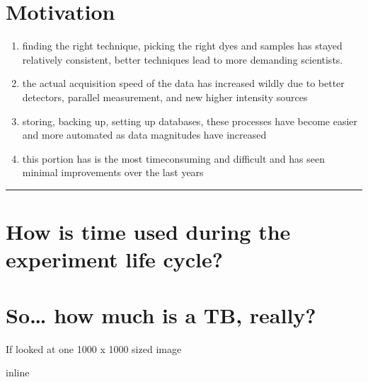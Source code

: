 \documentclass[letterpaper,10pt,english]{sphinxmanual}
\begin{document}
\section{Motivation}
\label{\detokenize{01-Introduction:motivation}}\begin{enumerate}
%
\item {} 
\sphinxAtStartPar
{} finding the right technique, picking the right dyes and samples has stayed relatively consistent, better techniques lead to more demanding scientists.

\item {} 
\sphinxAtStartPar
{} the actual acquisition speed of the data has increased wildly due to better detectors, parallel measurement, and new higher intensity sources

\item {} 
\sphinxAtStartPar
{} storing, backing up, setting up databases, these processes have become easier and more automated as data magnitudes have increased

\item {} 
\sphinxAtStartPar
{} this portion has is the most time\sphinxhyphen{}consuming and difficult and has seen minimal improvements over the last years

\end{enumerate}


\bigskip\hrule\bigskip



\section{How is time used during the experiment life cycle?}
\label{\detokenize{01-Introduction:how-is-time-used-during-the-experiment-life-cycle}}



\section{So… how much is a TB, really?}
\label{\detokenize{01-Introduction:so-how-much-is-a-tb-really}}
\sphinxAtStartPar
If  looked at one 1000 x 1000 sized image

\begin{sphinxVerbatim}[commandchars=\\\{\}]
 inline
   
   

    
             
\end{sphinxVerbatim}
\end{document}
